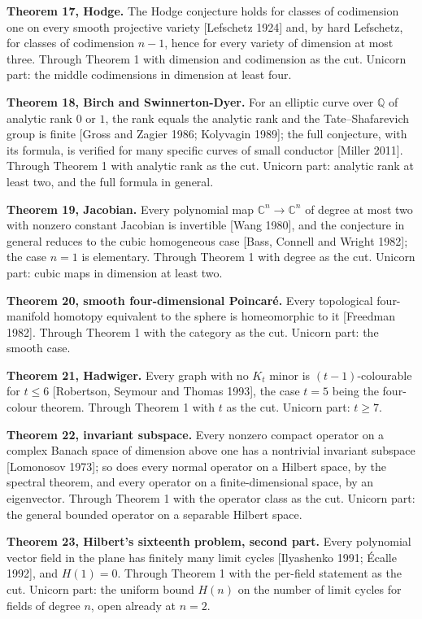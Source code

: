 \documentclass[10pt,twocolumn]{article}
\begin{document}
\textbf{Theorem 17, Hodge.} The Hodge conjecture holds for classes of
codimension one on every smooth projective variety {[}Lefschetz 1924{]}
and, by hard Lefschetz, for classes of codimension \(n - 1\), hence for
every variety of dimension at most three. Through Theorem 1 with
dimension and codimension as the cut. Unicorn part: the middle
codimensions in dimension at least four.

\textbf{Theorem 18, Birch and Swinnerton-Dyer.} For an elliptic curve
over \(\mathbb{Q}\) of analytic rank \(0\) or \(1\), the rank equals the
analytic rank and the Tate--Shafarevich group is finite {[}Gross and
Zagier 1986; Kolyvagin 1989{]}; the full conjecture, with its formula,
is verified for many specific curves of small conductor {[}Miller
2011{]}. Through Theorem 1 with analytic rank as the cut. Unicorn part:
analytic rank at least two, and the full formula in general.

\textbf{Theorem 19, Jacobian.} Every polynomial map
\(\mathbb{C}^n \to \mathbb{C}^n\) of degree at most two with nonzero
constant Jacobian is invertible {[}Wang 1980{]}, and the conjecture in
general reduces to the cubic homogeneous case {[}Bass, Connell and
Wright 1982{]}; the case \(n = 1\) is elementary. Through Theorem 1 with
degree as the cut. Unicorn part: cubic maps in dimension at least two.

\textbf{Theorem 20, smooth four-dimensional Poincaré.} Every topological
four-manifold homotopy equivalent to the sphere is homeomorphic to it
{[}Freedman 1982{]}. Through Theorem 1 with the category as the cut.
Unicorn part: the smooth case.

\textbf{Theorem 21, Hadwiger.} Every graph with no \(K_t\) minor is
\((t-1)\)-colourable for \(t \le 6\) {[}Robertson, Seymour and Thomas
1993{]}, the case \(t = 5\) being the four-colour theorem. Through
Theorem 1 with \(t\) as the cut. Unicorn part: \(t \ge 7\).

\textbf{Theorem 22, invariant subspace.} Every nonzero compact operator
on a complex Banach space of dimension above one has a nontrivial
invariant subspace {[}Lomonosov 1973{]}; so does every normal operator
on a Hilbert space, by the spectral theorem, and every operator on a
finite-dimensional space, by an eigenvector. Through Theorem 1 with the
operator class as the cut. Unicorn part: the general bounded operator on
a separable Hilbert space.

\textbf{Theorem 23, Hilbert's sixteenth problem, second part.} Every
polynomial vector field in the plane has finitely many limit cycles
{[}Ilyashenko 1991; Écalle 1992{]}, and \(H(1) = 0\). Through Theorem 1
with the per-field statement as the cut. Unicorn part: the uniform bound
\(H(n)\) on the number of limit cycles for fields of degree \(n\), open
already at \(n = 2\).
\end{document}
